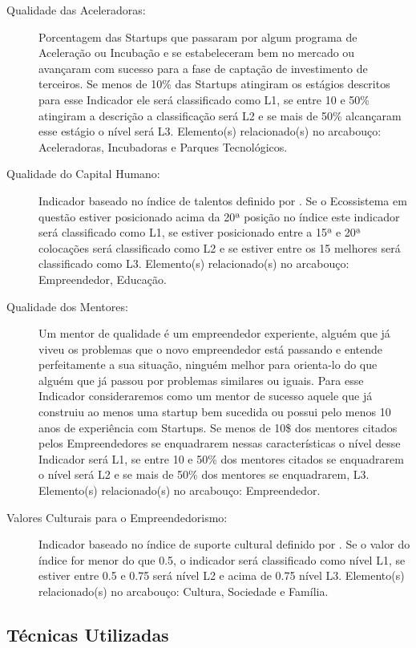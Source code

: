 \begin{description}
  \item [Qualidade das Aceleradoras:] Porcentagem das Startups que passaram por algum programa de Aceleração ou Incubação e se estabeleceram bem no mercado ou avançaram com sucesso para a fase de captação de investimento de terceiros. Se menos de 10\% das Startups atingiram os estágios descritos para esse Indicador ele será classificado como L1, se entre 10 e 50\% atingiram a descrição a classificação será L2 e se mais de 50\% alcançaram esse estágio o nível será L3. Elemento(s) relacionado(s) no arcabouço: Aceleradoras, Incubadoras e Parques Tecnológicos.
  
  \item [Qualidade do Capital Humano:] Indicador baseado no índice de talentos definido por . Se o Ecossistema em questão estiver posicionado acima da 20ª posição no índice este indicador será classificado como L1, se estiver posicionado entre a 15ª e 20ª colocações será classificado como L2 e se estiver entre os 15 melhores será classificado como L3. Elemento(s) relacionado(s) no arcabouço: Empreendedor, Educação.
  
  \item [Qualidade dos Mentores:] Um mentor de qualidade é um empreendedor experiente, alguém que já viveu os problemas que o novo empreendedor está passando e entende perfeitamente a sua situação, ninguém melhor para orienta-lo do que alguém que já passou por problemas similares ou iguais. Para esse Indicador consideraremos como um mentor de sucesso aquele que já construiu ao menos uma startup bem sucedida ou possui pelo menos 10 anos de experiência com Startups. Se menos de 10\$ dos mentores citados pelos Empreendedores se enquadrarem nessas características o nível desse Indicador será L1, se entre 10 e 50\% dos mentores citados se enquadrarem o nível será L2 e se mais de 50\% dos mentores se enquadrarem, L3. Elemento(s) relacionado(s) no arcabouço: Empreendedor.
  
  \item [Valores Culturais para o Empreendedorismo:] Indicador baseado no índice de suporte cultural definido por . Se o valor do índice for menor do que 0.5, o indicador será classificado como nível L1, se estiver entre 0.5 e 0.75 será nível L2 e acima de 0.75 nível L3. Elemento(s) relacionado(s) no arcabouço: Cultura, Sociedade e Família.
\end{description}

\subsection{Técnicas Utilizadas}
\label{subsection:tecnicas_utilizadas}

